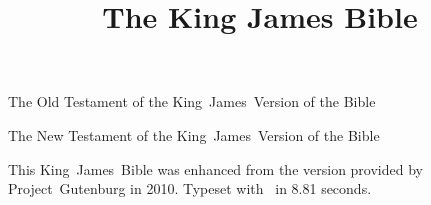\documentclass[twoside,twocolumn]{bible}
\title{The King James Bible}
\begin{document}
\null
\thispagestyle{empty}
\vfil
\centerline{\Large The Old Testament of the King~James~Version of the Bible}
\vfil
\null







































\null
\thispagestyle{empty}
\vfil
\centerline{\Large The New Testament of the King~James~Version of the Bible}
\vfil
\null




























\backmatter

This King~James~Bible was enhanced from the version provided by
Project~Gutenburg in 2010.  Typeset with \XeTeX\ in 8.81 seconds.
\end{document}
